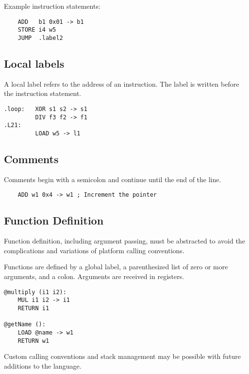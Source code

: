 Example instruction statements:

\begin{verbatim}
    ADD   b1 0x01 -> b1
    STORE i4 w5
    JUMP  .label2
\end{verbatim}

\subsection{Local labels}

A local label refers to the address of an instruction.
The label is written before the instruction statement.

\begin{verbatim}
.loop:   XOR s1 s2 -> s1
         DIV f3 f2 -> f1
.L21:
         LOAD w5 -> l1
\end{verbatim}

\subsection{Comments}

Comments begin with a semicolon and continue until the end of the line.

\begin{verbatim}
    ADD w1 0x4 -> w1 ; Increment the pointer
\end{verbatim}

\subsection{Function Definition}

Function definition, including argument passing, must be abstracted to avoid
the complications and variations of platform calling conventions.

Functions are defined by a global label, a parenthesized list of zero
or more arguments, and a colon. Arguments are received in registers.

\begin{verbatim}
@multiply (i1 i2):
    MUL i1 i2 -> i1
    RETURN i1

@getName ():
    LOAD @name -> w1
    RETURN w1
\end{verbatim}

Custom calling conventions and stack management may
be possible with future additions to the language.
